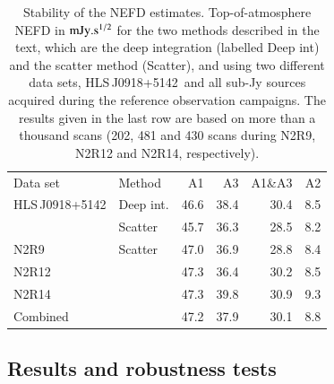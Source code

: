 \documentclass[traditionalabstract]{aa}
\newcommand{\hls}{HLS\,J0918+5142}
\begin{document}
\begin{table}[!htbp]
  \centering
  \caption[]{Stability of the NEFD estimates. Top-of-atmosphere NEFD
    in $\rm{mJy}.s^{1/2}$ for the two methods described in the text, which
  are the deep integration (labelled Deep int) and the scatter method
  (Scatter), and using two different data sets, \hls\
  and all sub-Jy sources acquired during the reference observation
  campaigns. The results given in the last row are based on more than a thousand
  scans (202, 481 and 430 scans during N2R9, N2R12 and N2R14, respectively).}
  \label{tab:nefd_summary}
  \begin{tabular}{llrrrr}
    \hline\hline
    \noalign{\smallskip}
    Data set   & Method   & A1      &   A3    &   A1\&A3 &    A2 \\
    \noalign{\smallskip}
    \hline
    \noalign{\smallskip}
    \hls &     Deep int.  &  46.6  &    38.4  &    30.4  &   8.5  \\
         &     Scatter    &  45.7  &    36.3  &    28.5  &   8.2  \\
    \hline
    \noalign{\smallskip}
    N2R9     & Scatter    & 47.0 &  36.9  & 28.8  & 8.4 \\
    N2R12    &            & 47.3 &  36.4  & 30.2  & 8.5 \\
    N2R14    &            & 47.3 &  39.8  & 30.9  & 9.3 \\
    Combined &            & 47.2 &  37.9  & 30.1  & 8.8 \\
    \hline
  \end{tabular}
\end{table}

\subsection{Results and robustness tests}
\label{se:nefd_results}
\end{document}

